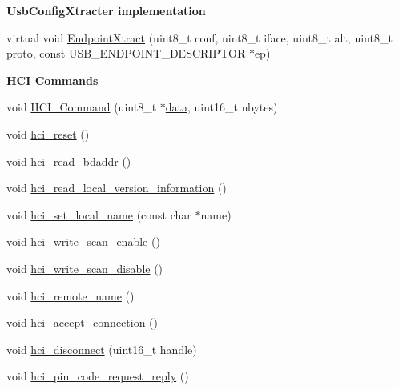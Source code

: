 \begin{Indent}{\bf \-Usb\-Config\-Xtracter implementation}\par
\begin{DoxyCompactItemize}
\item 
virtual void \hyperlink{class_b_t_d_a23928cd0e5711a2433aec763cfa55773}{\-Endpoint\-Xtract} (uint8\-\_\-t conf, uint8\-\_\-t iface, uint8\-\_\-t alt, uint8\-\_\-t proto, const \-U\-S\-B\-\_\-\-E\-N\-D\-P\-O\-I\-N\-T\-\_\-\-D\-E\-S\-C\-R\-I\-P\-T\-O\-R $\ast$ep)
\end{DoxyCompactItemize}
\end{Indent}
\begin{Indent}{\bf \-H\-C\-I \-Commands}\par
\begin{DoxyCompactItemize}
\item 
void \hyperlink{class_b_t_d_af11ad71d20783d46fe42dd405d10dfda}{\-H\-C\-I\-\_\-\-Command} (uint8\-\_\-t $\ast$\hyperlink{masstorage_8h_afb87d045bbf32b236fc425efe02bdc7b}{data}, uint16\-\_\-t nbytes)
\item 
void \hyperlink{class_b_t_d_ae6f942eabd29257bc4896e5f263275b6}{hci\-\_\-reset} ()
\item 
void \hyperlink{class_b_t_d_acb94a629477d85cebd16a9c5ecd4a8b3}{hci\-\_\-read\-\_\-bdaddr} ()
\item 
void \hyperlink{class_b_t_d_ae2ba215b6942f4131e4c5fdef2771e22}{hci\-\_\-read\-\_\-local\-\_\-version\-\_\-information} ()
\item 
void \hyperlink{class_b_t_d_a9a6747d58951f53389922d80e25b886c}{hci\-\_\-set\-\_\-local\-\_\-name} (const char $\ast$name)
\item 
void \hyperlink{class_b_t_d_a7dd7faaec1d3d9a1d8159cc2a4190977}{hci\-\_\-write\-\_\-scan\-\_\-enable} ()
\item 
void \hyperlink{class_b_t_d_aff59ab45d917406141ae0c9c79047f08}{hci\-\_\-write\-\_\-scan\-\_\-disable} ()
\item 
void \hyperlink{class_b_t_d_a8767529bd203c549348a38ac9c6682b3}{hci\-\_\-remote\-\_\-name} ()
\item 
void \hyperlink{class_b_t_d_a1cb07a155c69bb1fcf45ae030b8947ec}{hci\-\_\-accept\-\_\-connection} ()
\item 
void \hyperlink{class_b_t_d_a1bea5dd793a2f47006b4a7642efc9e56}{hci\-\_\-disconnect} (uint16\-\_\-t handle)
\item 
void \hyperlink{class_b_t_d_a70047b0f624c3f0ef29f8b76b8a34938}{hci\-\_\-pin\-\_\-code\-\_\-request\-\_\-reply} ()
\item 

\end{DoxyCompactItemize}
\end{Indent}
